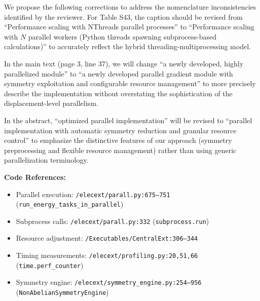 \documentclass[11pt]{article}
\begin{document}
We propose the following corrections to address the nomenclature inconsistencies identified by the reviewer. For Table S43, the caption should be revised from ``Performance scaling with NThreads parallel processes'' to ``Performance scaling with $N$ parallel workers (Python threads spawning subprocess-based calculations)'' to accurately reflect the hybrid threading-multiprocessing model.

In the main text (page 3, line 37), we will change ``a newly developed, highly parallelized module'' to ``a newly developed parallel gradient module with symmetry exploitation and configurable resource management'' to more precisely describe the implementation without overstating the sophistication of the displacement-level parallelism.

In the abstract, ``optimized parallel implementation'' will be revised to ``parallel implementation with automatic symmetry reduction and granular resource control'' to emphasize the distinctive features of our approach (symmetry preprocessing and flexible resource management) rather than using generic parallelization terminology.

\vspace{0.5cm}
\noindent\textbf{Code References:}
\begin{itemize}
\item Parallel execution: \texttt{/elecext/parall.py:675--751} (\texttt{run\_energy\_tasks\_in\_parallel})
\item Subprocess calls: \texttt{/elecext/parall.py:332} (\texttt{subprocess.run})
\item Resource adjustment: \texttt{/Executables/CentralExt:306--344}
\item Timing measurements: \texttt{/elecext/profiling.py:20,51,66} (\texttt{time.perf\_counter})
\item Symmetry engine: \texttt{/elecext/symmetry\_engine.py:254--956} (\texttt{NonAbelianSymmetryEngine})
\end{itemize}
\end{document}
